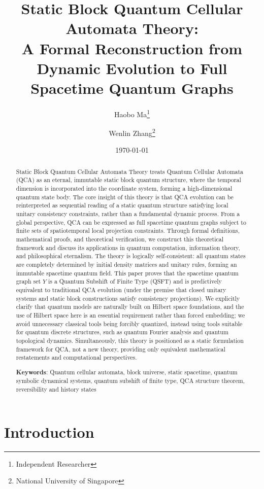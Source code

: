 \documentclass[11pt]{article}
\title{Static Block Quantum Cellular Automata Theory:\\ A Formal Reconstruction from Dynamic Evolution to Full Spacetime Quantum Graphs}
\author{Haobo Ma\thanks{Independent Researcher} \and Wenlin Zhang\thanks{National University of Singapore}}
\date{\today}
\theoremstyle{definition}
\theoremstyle{remark}
\begin{document}
\maketitle

\begin{abstract}
Static Block Quantum Cellular Automata Theory treats Quantum Cellular Automata (QCA) as an eternal, immutable static block quantum structure, where the temporal dimension is incorporated into the coordinate system, forming a high-dimensional quantum state body. The core insight of this theory is that QCA evolution can be reinterpreted as sequential reading of a static quantum structure satisfying local unitary consistency constraints, rather than a fundamental dynamic process. From a global perspective, QCA can be expressed as full spacetime quantum graphs subject to finite sets of spatiotemporal local projection constraints. Through formal definitions, mathematical proofs, and theoretical verification, we construct this theoretical framework and discuss its applications in quantum computation, information theory, and philosophical eternalism. The theory is logically self-consistent: all quantum states are completely determined by initial density matrices and unitary rules, forming an immutable spacetime quantum field. This paper proves that the spacetime quantum graph set \( Y \) is a Quantum Subshift of Finite Type (QSFT) and is predictively equivalent to traditional QCA evolution (under the premise that closed unitary systems and static block constructions satisfy consistency projections). We explicitly clarify that quantum models are naturally built on Hilbert space foundations, and the use of Hilbert space here is an essential requirement rather than forced embedding; we avoid unnecessary classical tools being forcibly quantized, instead using tools suitable for quantum discrete structures, such as quantum Fourier analysis and quantum topological dynamics. Simultaneously, this theory is positioned as a static formulation framework for QCA, not a new theory, providing only equivalent mathematical restatements and computational perspectives.

\noindent\textbf{Keywords}: Quantum cellular automata, block universe, static spacetime, quantum symbolic dynamical systems, quantum subshift of finite type, QCA structure theorem, reversibility and history states
\end{abstract}

\section{Introduction}
\end{document}
